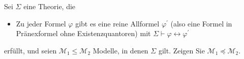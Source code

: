 
\begin{exercise}[146]
Sei $\Sigma$ eine Theorie, die
\begin{itemize}
  \item Zu jeder Formel $\varphi$ gibt es eine reine Allformel $\varphi^{\prime}$
  (also eine Formel in Pränexformel ohne Existenzquantoren) mit
  $\Sigma \vdash \varphi \leftrightarrow \varphi^{\prime}$
\end{itemize}
erfüllt, und seien $\mathscr{M}_1 \leq \mathscr{M}_2$ Modelle, in denen $\Sigma$ gilt.
Zeigen Sie $\mathscr{M}_1 \preccurlyeq \mathscr{M}_2$.
\end{exercise}


\begin{solution}
\phantom{}
\end{solution}

